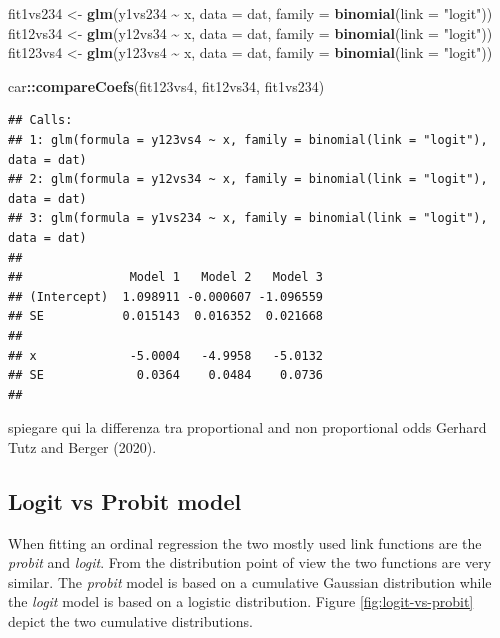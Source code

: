 \documentclass[
  man,floatsintext]{apa6}
\newenvironment{Shaded}{\begin{snugshade}}{\end{snugshade}}
\newcommand{\AttributeTok}[1]{\textcolor[rgb]{0.13,0.29,0.53}{#1}}
\newcommand{\FunctionTok}[1]{\textcolor[rgb]{0.13,0.29,0.53}{\textbf{#1}}}
\newcommand{\NormalTok}[1]{#1}
\newcommand{\OtherTok}[1]{\textcolor[rgb]{0.56,0.35,0.01}{#1}}
\newcommand{\SpecialCharTok}[1]{\textcolor[rgb]{0.81,0.36,0.00}{\textbf{#1}}}
\newcommand{\StringTok}[1]{\textcolor[rgb]{0.31,0.60,0.02}{#1}}
\begin{document}
\begin{Shaded}
\begin{Highlighting}[]
\NormalTok{fit1vs234 }\OtherTok{\textless{}{-}} \FunctionTok{glm}\NormalTok{(y1vs234 }\SpecialCharTok{\textasciitilde{}}\NormalTok{ x, }\AttributeTok{data =}\NormalTok{ dat, }\AttributeTok{family =} \FunctionTok{binomial}\NormalTok{(}\AttributeTok{link =} \StringTok{"logit"}\NormalTok{))}
\NormalTok{fit12vs34 }\OtherTok{\textless{}{-}} \FunctionTok{glm}\NormalTok{(y12vs34 }\SpecialCharTok{\textasciitilde{}}\NormalTok{ x, }\AttributeTok{data =}\NormalTok{ dat, }\AttributeTok{family =} \FunctionTok{binomial}\NormalTok{(}\AttributeTok{link =} \StringTok{"logit"}\NormalTok{))}
\NormalTok{fit123vs4 }\OtherTok{\textless{}{-}} \FunctionTok{glm}\NormalTok{(y123vs4 }\SpecialCharTok{\textasciitilde{}}\NormalTok{ x, }\AttributeTok{data =}\NormalTok{ dat, }\AttributeTok{family =} \FunctionTok{binomial}\NormalTok{(}\AttributeTok{link =} \StringTok{"logit"}\NormalTok{))}

\NormalTok{car}\SpecialCharTok{::}\FunctionTok{compareCoefs}\NormalTok{(fit123vs4, fit12vs34, fit1vs234)}
\end{Highlighting}
\end{Shaded}

\begin{verbatim}
## Calls:
## 1: glm(formula = y123vs4 ~ x, family = binomial(link = "logit"), data = dat)
## 2: glm(formula = y12vs34 ~ x, family = binomial(link = "logit"), data = dat)
## 3: glm(formula = y1vs234 ~ x, family = binomial(link = "logit"), data = dat)
## 
##               Model 1   Model 2   Model 3
## (Intercept)  1.098911 -0.000607 -1.096559
## SE           0.015143  0.016352  0.021668
##                                          
## x             -5.0004   -4.9958   -5.0132
## SE             0.0364    0.0484    0.0736
## 
\end{verbatim}

spiegare qui la differenza tra proportional and non proportional odds Gerhard Tutz and Berger (2020).

\subsection{Logit vs Probit model}\label{logit-vs-probit-model}

When fitting an ordinal regression the two mostly used link functions are the \emph{probit} and \emph{logit}. From the distribution point of view the two functions are very similar. The \emph{probit} model is based on a cumulative Gaussian distribution while the \emph{logit} model is based on a logistic distribution. Figure \ref{fig:logit-vs-probit} depict the two cumulative distributions.
\end{document}
